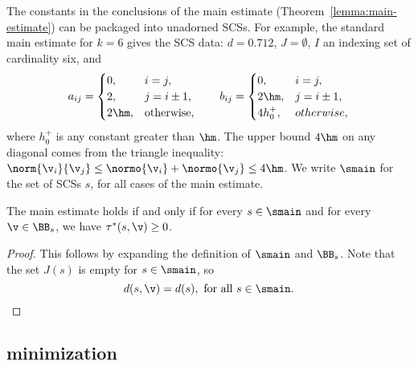 \begin{definition}[$\smain$]\label{ex:main} 
The constants in the conclusions of the main estimate
  (Theorem~\ref{lemma:main-estimate}) can be packaged into unadorned SCSs.  
For example, the standard main estimate for $k=6$ gives
  the SCS data: $d=0.712$, $J=\emptyset$, $I$ an indexing set
  of cardinality six, and
\[
a_{ij} = \begin{cases} 0, & i=j,\\
  2, & j= i\pm1,\\
  2 \hm, & \text{otherwise},
  \end{cases}
\qquad
b_{ij}=\begin{cases}
 0, & i=j,\\
 2\hm, & j= i\pm1,\\
 4h_0^+, & otherwise,
  \end{cases}
\]
where $h_0^+$ is any constant greater than $\hm$.
The upper bound $4\hm$ on any diagonal comes from the triangle
inequality: $\norm{\v_i}{\v_j} \le \normo{\v_i}+\normo{\v_j} \le
4\hm$.   
We write $\smain$ for the set of SCSs $s$, 
 for all cases of the main
estimate.
\end{definition}
%


\begin{lemma}\label{lemma:main-smain}  
The main estimate holds if and only if for every
$s\in\smain$ and for every $\v\in \BB_s$, we have $\tau^*(s,\v)\ge0$.
\end{lemma}

\begin{proof}  This follows by expanding the definition of $\smain$ and $\BB_s$.
Note that
the set $J(s)$ is empty for $s\in \smain$, so 
\[
d(s,\v) = d(s), \text{ for all } s \in \smain.
\]
\end{proof}







\subsection{minimization}




